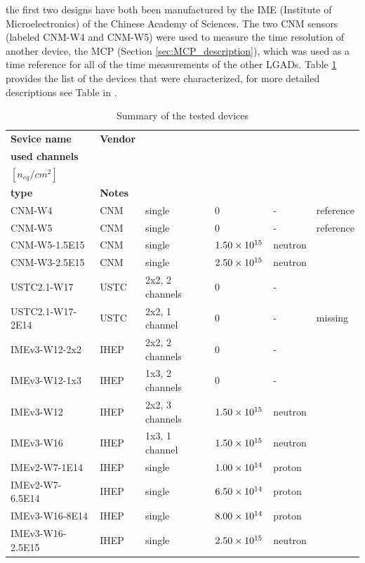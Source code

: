 the first two designs have both been manufactured by the IME (Institute of Microelectronics) of the Chinese Academy of Sciences. The two CNM sensors (labeled CNM-W4 and CNM-W5) were used to measure the time resolution of another device, the MCP (Section \ref{sec:MCP_description}), which was used as a time reference for all of the time measurements of the other LGADs. Table \ref{tab:devices_tested} provides the list of the devices that were characterized, for more detailed descriptions see Table in .

\begin{table}[!ht]
    \centering
    \caption{Summary of the tested devices}
    \label{tab:devices_tested}
    \scriptsize
    \begin{tabularx}{1\textwidth}{|l|l|l|l|l|X|}
    \hline %
        \textbf{Sevice name} & \textbf{Vendor} & \begin{tabular}{@{}l@{}}\textbf{Pads,} \\ \textbf{used channels}\end{tabular} & \begin{tabular}{@{}l@{}}\textbf{Fluence} \\ $[n_{eq}/\si{cm^2}]$ \end{tabular} & \begin{tabular}{@{}l@{}} \textbf{Radiation} \\ \textbf{type} \end{tabular} & \textbf{Notes} \\
        \hline
        CNM-W4  & CNM & single & 0 & - & reference \\ 
        CNM-W5  & CNM & single & 0 & - & reference \\ 
        CNM-W5-1.5E15  & CNM & single & $\num{1.50E+15}$ & neutron &  \\ 
        CNM-W3-2.5E15  & CNM & single & $\num{2.50E+15}$ & neutron &  \\ 
        USTC2.1-W17 & USTC & 2x2, 2 channels  & 0 & - &  \\ 
        USTC2.1-W17-2E14 & USTC & 2x2, 1 channel & 0 & - & missing \\ 
        IMEv3-W12-2x2  & IHEP & 2x2, 2 channels  & 0 & - &  \\ 
        IMEv3-W12-1x3  & IHEP & 1x3, 2 channels  & 0 & - &  \\ 
        IMEv3-W12  & IHEP & 2x2, 3 channels  & $\num{1.50E+15}$ & neutron &  \\ 
        IMEv3-W16  & IHEP & 1x3, 1 channel  & $\num{1.50E+15}$ & neutron &  \\ 
        IMEv2-W7-1E14  & IHEP & single & $\num{1.00E+14}$ & proton &  \\ 
        IMEv2-W7-6.5E14  & IHEP & single & $\num{6.50E+14}$ & proton &  \\ 
        IMEv3-W16-8E14  & IHEP & single & $\num{8.00E+14}$ & proton &  \\
        IMEv3-W16-2.5E15  & IHEP & single & $\num{2.50E+15}$ & neutron &  \\ 
        \hline
    \end{tabularx}
\end{table}




